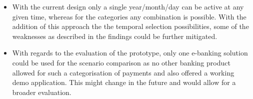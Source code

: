 \begin{itemize}[]
	\item With the current design only a single year/month/day can be active at any given time, whereas for the categories any combination is possible. With the addition of this approach the the temporal selection possibilities, some of the weaknesses as described in the findings could be further mitigated.
	
	\item With regards to the evaluation of the prototype, only one e-banking solution could be used for the scenario comparison as no other banking product allowed for such a categorisation of payments and also offered a working demo application. This might change in the future and would allow for a broader evaluation.
\end{itemize}
